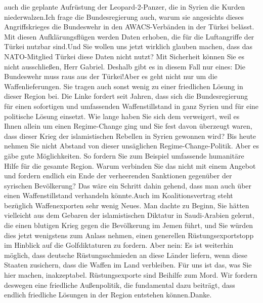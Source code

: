 \documentclass{article}
\begin{document}
auch die geplante Aufrüstung der Leopard-2-Panzer, die in Syrien die Kurden niederwalzen.Ich frage die Bundesregierung auch, warum sie angesichts dieses Angriffskrieges die Bundeswehr in den AWACS-Verbänden in der Türkei belässt. Mit diesen Aufklärungsflügen werden Daten erhoben, die für die Luftangriffe der Türkei nutzbar sind.Und Sie wollen uns jetzt wirklich glauben machen, dass das NATO-Mitglied Türkei diese Daten nicht nutzt? Mit Sicherheit können Sie es nicht ausschließen, Herr Gabriel. Deshalb gibt es in diesem Fall nur eines: Die Bundeswehr muss raus aus der Türkei!Aber es geht nicht nur um die Waffenlieferungen. Sie tragen auch sonst wenig zu einer friedlichen Lösung in dieser Region bei. Die Linke fordert seit Jahren, dass sich die Bundesregierung für einen sofortigen und umfassenden Waffenstillstand in ganz Syrien und für eine politische Lösung einsetzt. Wie lange haben Sie sich dem verweigert, weil es Ihnen allein um einen Regime-­Change ging und Sie fest davon überzeugt waren, dass dieser Krieg der islamistischen Rebellen in Syrien gewonnen wird? Bis heute nehmen Sie nicht Abstand von dieser unsäglichen Regime-Change-Politik. Aber es gäbe gute Möglichkeiten. So fordern Sie zum Beispiel umfassende humanitäre Hilfe für die gesamte Region. Warum verbinden Sie das nicht mit einem Angebot und fordern endlich ein Ende der verheerenden Sanktionen gegenüber der syrischen Bevölkerung? Das wäre ein Schritt dahin gehend, dass man auch über einen Waffenstillstand verhandeln könnte.Auch im Koalitionsvertrag steht bezüglich Waffenexporten sehr wenig Neues. Man dachte zu Beginn, Sie hätten vielleicht aus dem Gebaren der islamistischen Diktatur in Saudi-Arabien gelernt, die einen blutigen Krieg gegen die Bevölkerung im Jemen führt, und Sie würden dies jetzt wenigstens zum Anlass nehmen, einen generellen Rüstungsexportstopp im Hinblick auf die Golfdiktaturen zu fordern. Aber nein: Es ist weiterhin möglich, dass deutsche Rüstungsschmieden an diese Länder liefern, wenn diese Staaten zusichern, dass die Waffen im Land verbleiben. Für uns ist das, was Sie hier machen, inakzeptabel. Rüstungsexporte sind Beihilfe zum Mord. Wir fordern deswegen eine friedliche Außenpolitik, die fundamental dazu beiträgt, dass endlich friedliche Lösungen in der Region entstehen können.Danke.
\end{document}
